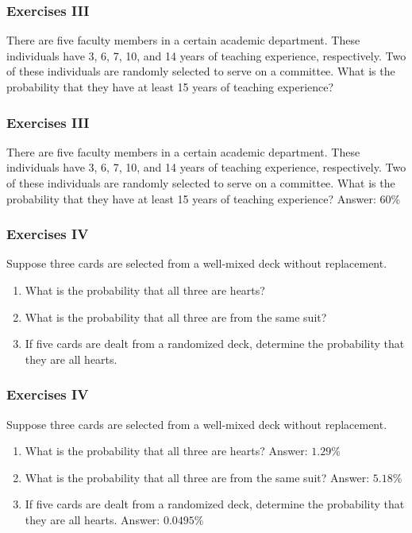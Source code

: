 \documentclass[xcolor=dvipsnames]{beamer}
\begin{document}
\begin{frame}
  \frametitle{Exercises III}
There are five faculty members in a certain academic department. These
individuals have 3, 6, 7, 10, and 14 years of teaching experience,
respectively. Two of these individuals are randomly selected to serve
on a committee. What is the probability that they have at least 15
years of teaching experience?
\end{frame}

\begin{frame}
  \frametitle{Exercises III}
There are five faculty members in a certain academic department. These
individuals have 3, 6, 7, 10, and 14 years of teaching experience,
respectively. Two of these individuals are randomly selected to serve
on a committee. What is the probability that they have at least 15
years of teaching experience? Answer: 60\%
\end{frame}

\begin{frame}
  \frametitle{Exercises IV}
Suppose three cards are selected from a well-mixed deck without
replacement. 
\begin{enumerate}
\item<1-> What is the probability that all three are hearts?
\item<2-> What is the probability that all three are from the same
  suit?
\item<3-> If five cards are dealt from a randomized deck, determine
  the probability that they are all hearts.
\end{enumerate}
\end{frame}

\begin{frame}
  \frametitle{Exercises IV}
Suppose three cards are selected from a well-mixed deck without
replacement. 
\begin{enumerate}
\item What is the probability that all three are hearts? Answer: $1.29$\%
\item What is the probability that all three are from the same
  suit? Answer: $5.18$\%
\item If five cards are dealt from a randomized deck, determine
  the probability that they are all hearts. Answer: $0.0495$\%
\end{enumerate}
\end{frame}
\end{document}
